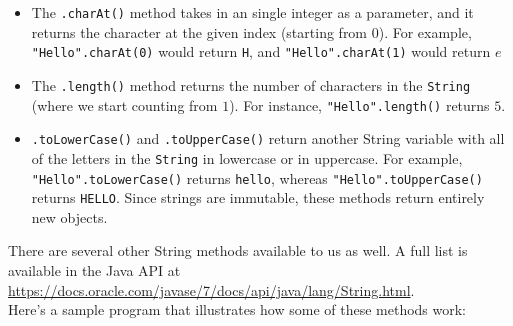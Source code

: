 \begin{itemize}
    \item The \verb!.charAt()! method takes in an single integer as a parameter, and it returns the character at the given index (starting from $0$). For example, \verb!"Hello".charAt(0)! would return \verb!H!, and \verb!"Hello".charAt(1)! would return $e$
    \item The \verb!.length()! method returns the number of characters in the \verb!String! (where we start counting from $1$). For instance, \verb!"Hello".length()! returns $5$.
    \item \verb!.toLowerCase()! and \verb!.toUpperCase()! return another String variable with all of the letters in the \verb!String! in lowercase or in uppercase. For example, \verb!"Hello".toLowerCase()! returns \verb!hello!, whereas \verb!"Hello".toUpperCase()! returns \verb!HELLO!. Since strings are immutable, these methods return entirely new objects.
\end{itemize}

There are several other String methods available to us as well. A full list is available in the Java API at \url{https://docs.oracle.com/javase/7/docs/api/java/lang/String.html}. \\

Here's a sample program that illustrates how some of these methods work:

